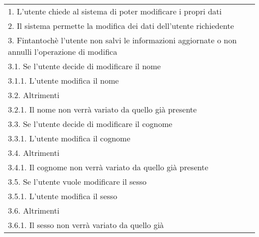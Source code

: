 \begin{longtable}{@{}|>{\centering\arraybackslash}m{.2\textwidth}|m{.7\textwidth}|@{}}
		Sequenza delle azioni & \begin{tabular}{m{0.9\linewidth}}\hspace{0.0cm}1. L'utente chiede al sistema di poter modificare i propri dati\\\hspace{0.0cm}2. Il sistema permette la modifica dei dati dell'utente richiedente\\\hspace{0.0cm}3. Fintantochè l'utente non salvi le informazioni aggiornate o non annulli l'operazione di modifica\\\hspace{0.5cm}\hspace{0.0cm}3.1. Se l'utente decide di modificare il nome\\\hspace{1.0cm}\hspace{0.5cm}\hspace{0.0cm}3.1.1. L'utente modifica il nome\\\hspace{0.5cm}\hspace{0.0cm}3.2. Altrimenti\\\hspace{1.0cm}\hspace{0.5cm}\hspace{0.0cm}3.2.1. Il nome non verrà variato da quello già presente\\\hspace{0.5cm}\hspace{0.0cm}3.3. Se l'utente decide di modificare il cognome\\\hspace{1.0cm}\hspace{0.5cm}\hspace{0.0cm}3.3.1. L'utente modifica il cognome\\\hspace{0.5cm}\hspace{0.0cm}3.4. Altrimenti\\\hspace{1.0cm}\hspace{0.5cm}\hspace{0.0cm}3.4.1. Il cognome non verrà variato da quello già presente\\\hspace{0.5cm}\hspace{0.0cm}3.5. Se l'utente vuole modificare il sesso\\\hspace{1.0cm}\hspace{0.5cm}\hspace{0.0cm}3.5.1. L'utente modifica il sesso\\\hspace{0.5cm}\hspace{0.0cm}3.6. Altrimenti\\\hspace{1.0cm}\hspace{0.5cm}\hspace{0.0cm}3.6.1. Il sesso non verrà variato da quello già 
\end{longtable}
